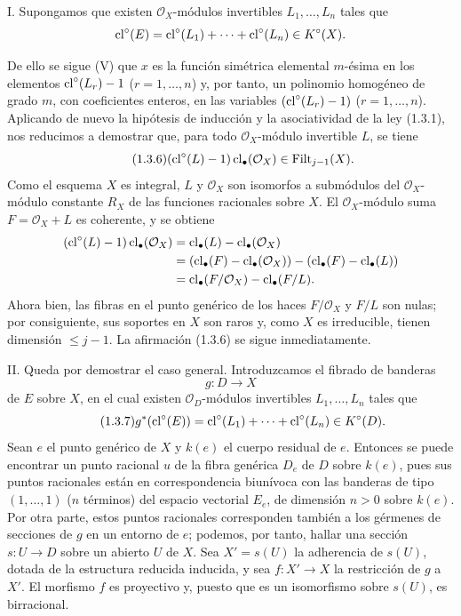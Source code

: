 I. Supongamos que existen $\mathcal O_X$-módulos invertibles
$L_1,\ldots,L_n$ tales que
\[
\operatorname{cl}^\circ(E)=\operatorname{cl}^\circ(L_1)+\cdots+\operatorname{cl}^\circ(L_n)\in K^\circ(X).
\]

De ello se sigue (V) que $x$ es la función simétrica elemental $m$-ésima en
los elementos $\operatorname{cl}^\circ(L_r)-1$ ($r=1,\ldots,n$) y, por tanto, un polinomio
homogéneo de grado $m$, con coeficientes enteros, en las variables
$(\operatorname{cl}^\circ(L_r)-1)$ ($r=1,\ldots,n$). Aplicando de nuevo la hipótesis de
inducción y la asociatividad de la ley (1.3.1), nos reducimos a demostrar que,
para todo $\mathcal O_X$-módulo invertible $L$, se tiene
\begin{equation}\tag{1.3.6}
(\operatorname{cl}^\circ(L)-1)\operatorname{cl}_\bullet(\mathcal O_X)\in\operatorname{Filt}_{j-1}(X).
\end{equation}
Como el esquema $X$ es integral, $L$ y $\mathcal O_X$ son isomorfos a
submódulos del $\mathcal O_X$-módulo constante $R_X$ de las funciones
racionales sobre $X$. El $\mathcal O_X$-módulo suma
$F=\mathcal O_X+L$ es coherente, y se obtiene
\begin{align*}
(\operatorname{cl}^\circ(L)-1)\operatorname{cl}_\bullet(\mathcal O_X)
&=\operatorname{cl}_\bullet(L)-\operatorname{cl}_\bullet(\mathcal O_X)\\
&=(\operatorname{cl}_\bullet(F)-\operatorname{cl}_\bullet(\mathcal O_X))
  -(\operatorname{cl}_\bullet(F)-\operatorname{cl}_\bullet(L))\\
&=\operatorname{cl}_\bullet(F/\mathcal O_X)-\operatorname{cl}_\bullet(F/L).
\end{align*}
Ahora bien, las fibras en el punto genérico de los haces
$F/\mathcal O_X$ y $F/L$ son nulas; por consiguiente, sus soportes en $X$
son raros y, como $X$ es irreducible, tienen dimensión $\leq j-1$.
La afirmación (1.3.6) se sigue inmediatamente.

II. Queda por demostrar el caso general. Introduzcamos el fibrado de banderas
\[
g:D\longrightarrow X
\]
de $E$ sobre $X$, en el cual existen $\mathcal O_D$-módulos invertibles
$L_1,\ldots,L_n$ tales que
\begin{equation}\tag{1.3.7}
g^*(\operatorname{cl}^\circ(E))
=\operatorname{cl}^\circ(L_1)+\cdots+\operatorname{cl}^\circ(L_n)\in K^\circ(D).
\end{equation}
Sean $e$ el punto genérico de $X$ y $k(e)$ el cuerpo residual de $e$. Entonces
se puede encontrar un punto racional $u$ de la fibra genérica $D_e$ de $D$
sobre $k(e)$,
pues sus puntos racionales están en correspondencia biunívoca con las
banderas de tipo $(1,\ldots,1)$ ($n$ términos) del espacio vectorial $E_e$,
de dimensión $n>0$ sobre $k(e)$. Por otra parte, estos puntos racionales
corresponden también a los gérmenes de secciones de $g$ en un entorno de
$e$; podemos, por tanto, hallar una sección $s:U\to D$ sobre un abierto
$U$ de $X$. Sea $X'=s(U)$ la adherencia de $s(U)$, dotada de la estructura
reducida inducida, y sea $f:X'\to X$ la restricción de $g$ a $X'$. El
morfismo $f$ es proyectivo y, puesto que es un isomorfismo sobre $s(U)$,
es birracional.

